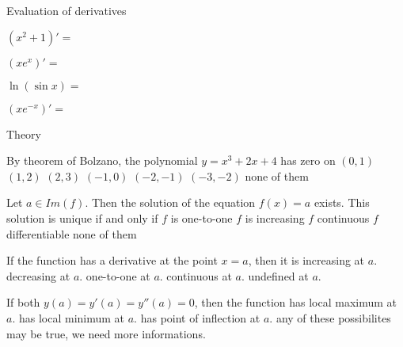 \documentclass{article}
\begin{document}
\begin{category}{Evaluation of derivatives}
  \begin{question}$(x^2+1)'=$
  \end{question}
  \begin{question}$(xe^x)'=$
  \end{question}
  \begin{question}$\ln(\sin x)=$
  \end{question}
  \begin{question}$(xe^{-x})'=$
  \end{question}
\end{category}



\begin{category}{Theory}

\begin{question} By theorem of Bolzano, the polynomial $y=x^3+2x+4$ has zero on
 $(0,1)$
 $(1,2)$
 $(2,3)$
 $(-1,0)$
 $(-2,-1)$
 $(-3,-2)$
 none of them
\end{question}


\begin{question}
Let $a\in Im(f)$. Then the solution of the equation $f(x)=a$ exists. This
solution is unique if and only if
 $f$ is one-to-one
 $f$ is increasing
 $f$ continuous
 $f$ differentiable
 none of them
\end{question}


\begin{question}
If the function has a derivative at the point $x=a$, then it is
 increasing at $a$.
 decreasing at $a$.
 one-to-one at $a$.
 continuous at $a$.
 undefined at $a$.
\end{question}

\begin{question}
If both $y(a)=y'(a)=y''(a)=0$, then the function
 has local maximum at $a$.
 has local minimum at $a$.
 has point of inflection at $a$.
 any of these possibilites may be true, we need more informations.
\end{question}

\end{category}
\end{document}

